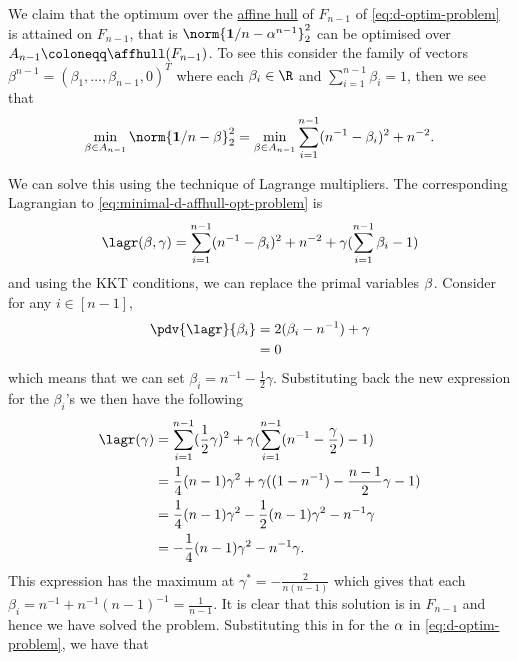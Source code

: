 We claim that the optimum over the \hyperref[def:aff-hull]{affine hull} of \(F_{n-1}\) of
\ref{eq:d-optim-problem} is attained on \(F_{n-1}\), that is
\(\norm{\mathbf{1}/n - \alpha^{n-1}}_{2}^{2}\) can be optimised over \(A_{n-1}
\coloneqq \affhull(F_{n-1})\). To see this consider the family of vectors
\(\beta^{n-1} = (\beta_{1}, \dots, \beta_{n-1}, 0)^{T}\) where each \(\beta_{i}
\in \R\) and \(\sum_{i=1}^{n-1}\beta_{i} = 1\), then we see that
\begin{equation}
  \label{eq:minimal-d-affhull-opt-problem}
  \min_{\mat{\beta} \in A_{n-1}}\norm{\mathbf{1}/n - \mat{\beta}}^{2}_{2} = \min_{\mat{\beta} \in A_{n-1}} \sum_{i=1}^{n-1} (n^{-1} - \beta_{i})^{2} + n^{-2}.
\end{equation}

We can solve this using the technique of Lagrange multipliers. The corresponding
Lagrangian to
\ref{eq:minimal-d-affhull-opt-problem} is
\begin{equation*}
  \lagr(\mat{\beta}, \gamma) = \sum_{i=1}^{n-1} (n^{-1} - \beta_{i})^{2} + n^{-2} + \gamma (\sum_{i=1}^{n-1} \beta_i - 1)
\end{equation*}
and using the KKT conditions, we can replace the primal variables
\(\mathbf{\beta}\). Consider for any \(i \in [n-1]\),
\begin{align*}
  \pdv{\lagr}{\beta_{i}} & = 2(\beta_{i} - n^{-1}) + \gamma \\
                         & = 0
\end{align*}
which means that we can set \(\beta_{i} = n^{-1} - \frac{1}{2}\gamma\).
Substituting back the new expression for the \(\beta_i\)'s we then have the
following
\begin{align*}
  \lagr(\gamma) & = \sum_{i=1}^{n-1} (\frac{1}{2} \gamma)^{2} + \gamma (\sum_{i=1}^{n-1} (n^{-1} - \frac{\gamma}{2}) - 1) \\
                & = \frac{1}{4}(n-1)\gamma^{2} + \gamma((1 - n^{-1}) - \frac{n-1}{2}\gamma - 1) \\
                & = \frac{1}{4}(n-1)\gamma^{2} - \frac{1}{2}(n-1)\gamma^{2} - n^{-1} \gamma \\
                & = -\frac{1}{4}(n-1)\gamma^{2} - n^{-1} \gamma.
\end{align*}
This expression has the maximum at \(\gamma^{\ast} = -\frac{2}{n(n-1)}\) which
gives that each \(\beta_{i} = n^{-1} + n^{-1}(n-1)^{-1} = \frac{1}{n-1}\). It is
clear that this solution is in \(F_{n-1}\) and hence we have solved the problem.
Substituting this in for the \(\mathbf{\alpha}\) in
\ref{eq:d-optim-problem}, we have that
